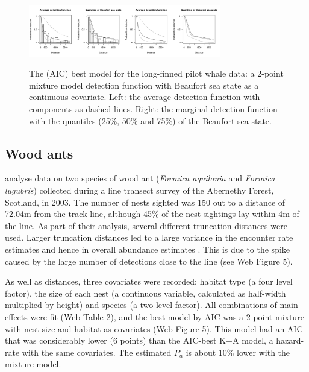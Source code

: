 \documentclass[useAMS,referee,usenatbib]{biom}
\begin{document}
\begin{figure}
\centering
\includegraphics[width=0.375\textwidth, trim= 0 0 3.8in 0, clip=true]{analyses/danpike-bssc.pdf}\includegraphics[width=0.375\textwidth, trim= 3.8in 0 0 0, clip=true]{analyses/danpike-bssc-hh.pdf}
\caption{The (AIC) best model for the long-finned pilot whale data: a 2-point mixture model detection function with Beaufort sea state as a continuous covariate. Left: the average detection function with components as dashed lines. Right: the marginal detection function with the quantiles (25\%, 50\% and 75\%) of the Beaufort sea state.}
\label{danpike-detfct}
\end{figure}


\subsection{Wood ants}
\label{s:woodant}

\cite{Borkin:2012wn} analyse data on two species of wood ant (\textit{Formica aquilonia} and \textit{Formica lugubris}) collected during a line transect survey of the Abernethy Forest, Scotland, in 2003. The number of nests sighted was 150 out to a distance of 72.04m from the track line, although 45\% of the nest sightings lay within 4m of the line. As part of their analysis, several different truncation distances were used. Larger truncation distances led to a large variance in the encounter rate estimates and hence in overall abundance estimates \citep[see][]{Borkin:2012wn}. This is due to the spike caused by the large number of detections close to the line (see Web Figure 5).

As well as distances, three covariates were recorded: habitat type (a four level factor), the size of each nest (a continuous variable, calculated as half-width multiplied by height) and species (a two level factor). All combinations of main effects were fit (Web Table 2), and the best model by AIC was a 2-point mixture with nest size and habitat as covariates (Web Figure 5). This model had an AIC that was considerably lower (6 points) than the AIC-best K+A model, a hazard-rate with the same covariates.  The estimated $P_a$ is about 10\% lower with the mixture model.
\end{document}
